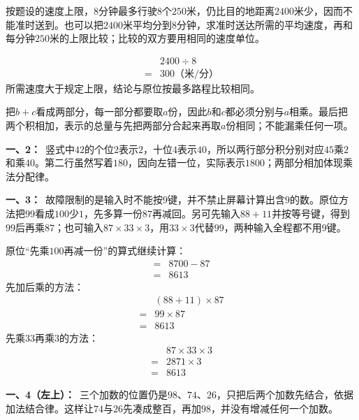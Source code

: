 \documentclass[multi=snippet,border=0pt]{standalone}
\newenvironment{snippet}[3]{\begin{minipage}{#1bp}\color{answerred}\fontsize{#2}{#3}\selectfont\raggedright}{\end{minipage}}
\begin{document}
\begin{snippet}{505}{11.5}{14}按题设的速度上限，\(8\)分钟最多行驶\(8\)个\(250\)米，仍比目的地距离\(2400\)米少，因而不能准时送到。也可以把\(2400\)米平均分到\(8\)分钟，求准时送达所需的平均速度，再和每分钟\(250\)米的上限比较；比较的双方要用相同的速度单位。\par \[\begin{aligned}&2400\div8\\={}&300\text{（米/分）}\end{aligned}\]所需速度大于规定上限，结论与原位按最多路程比较相同。\end{snippet}
\begin{snippet}{505}{11.5}{14}把\(b+c\)看成两部分，每一部分都要取\(a\)份，因此\(b\)和\(c\)都必须分别与\(a\)相乘。最后把两个积相加，表示的总量与先把两部分合起来再取\(a\)份相同；不能漏乘任何一项。\end{snippet}
\begin{snippet}{505}{11.5}{14}\textbf{一、2：}\ 竖式中\(42\)的个位\(2\)表示\(2\)，十位\(4\)表示\(40\)，所以两行部分积分别对应\(45\)乘\(2\)和乘\(40\)。第二行虽然写着\(180\)，因向左错一位，实际表示\(1800\)；两部分相加体现乘法分配律。\end{snippet}
\begin{snippet}{505}{11.5}{14}\textbf{一、3：}\ 故障限制的是输入时不能按\(9\)键，并不禁止屏幕计算出含\(9\)的数。原位方法把\(99\)看成\(100\)少\(1\)，先多算一份\(87\)再减回。另可先输入\(88+11\)并按等号键，得到\(99\)后再乘\(87\)；也可输入\(87\times33\times3\)，用\(33\times3\)代替\(99\)，两种输入全程都不用\(9\)键。\par 原位“先乘\(100\)再减一份”的算式继续计算：\[\begin{aligned}={}&8700-87\\={}&8613\end{aligned}\]先加后乘的方法：\[\begin{aligned}&(88+11)\times87\\={}&99\times87\\={}&8613\end{aligned}\]先乘\(33\)再乘\(3\)的方法：\[\begin{aligned}&87\times33\times3\\={}&2871\times3\\={}&8613\end{aligned}\]\end{snippet}
\begin{snippet}{505}{11.5}{14}\textbf{一、4（左上）：}\ 三个加数的位置仍是\(98\)、\(74\)、\(26\)，只把后两个加数先结合，依据加法结合律。这样让\(74\)与\(26\)先凑成整百，再加\(98\)，并没有增减任何一个加数。\end{snippet}
\end{document}
